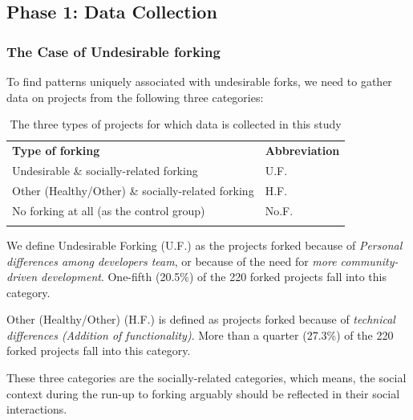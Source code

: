 \documentclass[11pt]{report}
\begin{document}
\subsection{Phase 1: Data Collection}
\label{DataCollection}

\subsubsection{The Case of Undesirable forking}
To find patterns uniquely associated with undesirable forks, we need to gather data on projects from the following three categories: 

\begin{table} [H]
\caption[Undesirable forking vs. Other categories]{The three types of projects for which data is collected in this study}
\label{tableUndesirableForkingDataCollect} 
\begin{tabular}{p{} p{}}
\hline\noalign{\smallskip}
\textbf{Type of forking} & \textbf{Abbreviation} \\
\noalign{\smallskip}\hline\noalign{\smallskip}
Undesirable \& socially-related forking & U.F. \\ \hline
Other (Healthy/Other) \& socially-related forking & H.F. \\\hline
No forking at all (as the control group) & No.F. \\
\noalign{\smallskip}\hline
\end{tabular}
\end{table}

We define Undesirable Forking (U.F.) as the projects forked because of \textit{Personal differences among developers team}, or because of the need for \textit{more community-driven development}. One-fifth (20.5\%) of the 220 forked projects fall into this category.

Other (Healthy/Other) (H.F.) is defined as projects forked because of \textit{technical differences (Addition of functionality)}. More than a quarter (27.3\%) of the 220 forked projects fall into this category.

These three categories are the socially-related categories, which means, the social context during the run-up to forking arguably should be reflected in their social interactions. 
\end{document}
